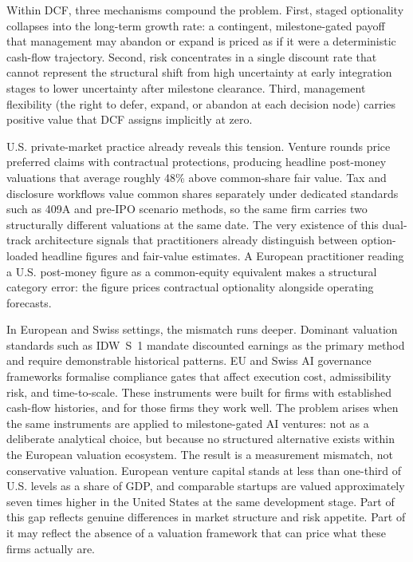 \documentclass[oneside,10pt]{swissi}
\begin{document}
Within DCF, three mechanisms compound the problem. First, staged optionality collapses into the long-term growth rate: a contingent, milestone-gated payoff that management may abandon or expand is priced as if it were a deterministic cash-flow trajectory. Second, risk concentrates in a single discount rate that cannot represent the structural shift from high uncertainty at early integration stages to lower uncertainty after milestone clearance. Third, management flexibility (the right to defer, expand, or abandon at each decision node) carries positive value that DCF assigns implicitly at zero.

U.S. private-market practice already reveals this tension. Venture rounds price preferred claims with contractual protections, producing headline post-money valuations that average roughly 48\% above common-share fair value.\cite{gornall2020squaring} Tax and disclosure workflows value common shares separately under dedicated standards such as 409A and pre-IPO scenario methods,\cite{us26cfr1409a1,maplebear2023s1correspondence} so the same firm carries two structurally different valuations at the same date. The very existence of this dual-track architecture signals that practitioners already distinguish between option-loaded headline figures and fair-value estimates. A European practitioner reading a U.S. post-money figure as a common-equity equivalent makes a structural category error: the figure prices contractual optionality alongside operating forecasts.

In European and Swiss settings, the mismatch runs deeper. Dominant valuation standards such as IDW~S~1 mandate discounted earnings as the primary method and require demonstrable historical patterns.\cite{idw2016s1} EU and Swiss AI governance frameworks formalise compliance gates that affect execution cost, admissibility risk, and time-to-scale.\cite{eu2024aiact,finma2024guidance08,bakom2025aiapproach} These instruments were built for firms with established cash-flow histories, and for those firms they work well. The problem arises when the same instruments are applied to milestone-gated AI ventures: not as a deliberate analytical choice, but because no structured alternative exists within the European valuation ecosystem. The result is a measurement mismatch, not conservative valuation. European venture capital stands at less than one-third of U.S. levels as a share of GDP, and comparable startups are valued approximately seven times higher in the United States at the same development stage.\cite{arnold2024steppingup,draghi2024competitiveness} Part of this gap reflects genuine differences in market structure and risk appetite. Part of it may reflect the absence of a valuation framework that can price what these firms actually are.
\end{document}

